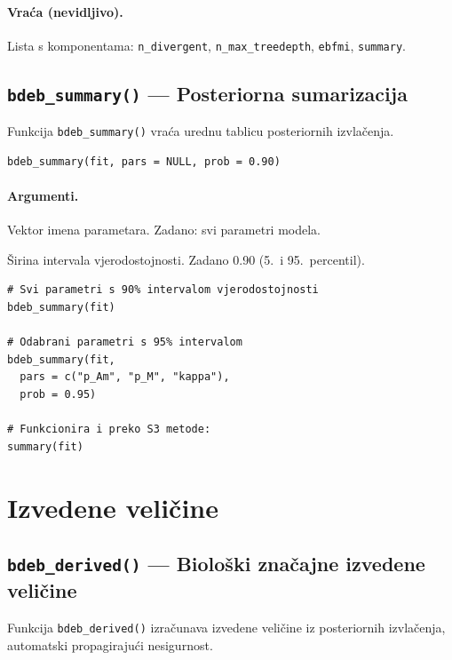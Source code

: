 \documentclass[11pt,a4paper]{article}
\newcommand{\fn}[1]{\texttt{#1()}}
\newcommand{\code}[1]{\texttt{#1}}
\begin{document}
\paragraph{Vraća (nevidljivo).} Lista s komponentama:
\code{n\_divergent}, \code{n\_max\_treedepth}, \code{ebfmi}, \code{summary}.


\subsection{\fn{bdeb\_summary} --- Posteriorna sumarizacija}

Funkcija \fn{bdeb\_summary} vraća urednu tablicu posteriornih
izvlačenja.

\begin{lstlisting}
bdeb_summary(fit, pars = NULL, prob = 0.90)
\end{lstlisting}

\paragraph{Argumenti.}
\begin{description}[nosep,leftmargin=2.5cm]
  \item[\code{pars}] Vektor imena parametara.  Zadano: svi parametri modela.
  \item[\code{prob}] Širina intervala vjerodostojnosti.  Zadano 0.90
    (5.\ i 95.\ percentil).
\end{description}

\begin{lstlisting}
# Svi parametri s 90% intervalom vjerodostojnosti
bdeb_summary(fit)

# Odabrani parametri s 95% intervalom
bdeb_summary(fit,
  pars = c("p_Am", "p_M", "kappa"),
  prob = 0.95)

# Funkcionira i preko S3 metode:
summary(fit)
\end{lstlisting}


\section{Izvedene veličine}
\label{sec:izvedene}

\subsection{\fn{bdeb\_derived} --- Biološki značajne izvedene veličine}

Funkcija \fn{bdeb\_derived} izračunava izvedene veličine iz posteriornih
izvlačenja, automatski propagirajući nesigurnost.
\end{document}
